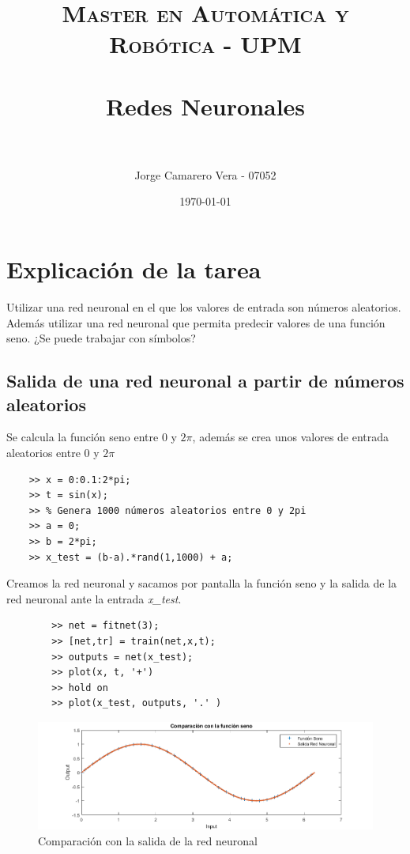 \documentclass[a4paper, fontsize=11pt]{scrartcl} %
\title{	
	\normalfont \normalsize 
	\textsc{Master en Automática y Robótica - UPM} \\ [25pt] %
	\horrule{0.5pt} \\[0.4cm] %
	\huge Redes Neuronales \\ %
	\horrule{2pt} \\[0.5cm] %
}
\author{Jorge Camarero Vera - 07052} %
\date{\normalsize\today} %
\numberwithin{equation}{section} %
\numberwithin{figure}{section} %
\numberwithin{table}{section} %
\begin{document}
	\maketitle
	
	\section{Explicación de la tarea}
	
	Utilizar una red neuronal en el que los valores de entrada son números aleatorios. Además utilizar una red neuronal que permita predecir valores de una función seno. ¿Se puede trabajar con símbolos?

	\subsection{Salida de una red neuronal a partir de números aleatorios}	
	
	Se calcula la función seno entre $0$ y $2\pi$, además se crea unos valores de entrada aleatorios entre $0$ y $2\pi$
	
	\begin{lstlisting}
	>> x = 0:0.1:2*pi;
	>> t = sin(x);
	>> % Genera 1000 números aleatorios entre 0 y 2pi
	>> a = 0;
	>> b = 2*pi;
	>> x_test = (b-a).*rand(1,1000) + a;
	\end{lstlisting}
	
	Creamos la red neuronal y sacamos por pantalla la función seno y la salida de la red neuronal ante la entrada \textit{x\_test}.
	
	\begin{lstlisting}
		>> net = fitnet(3);
		>> [net,tr] = train(net,x,t);
		>> outputs = net(x_test);
		>> plot(x, t, '+')
		>> hold on
		>> plot(x_test, outputs, '.' )
	\end{lstlisting}
	
	
	\begin{figure}[h!]
		\centering
		\includegraphics[width=1.0\linewidth]{images/Neuronal.PNG}
		\caption{Comparación con la salida de la red neuronal}
		\label{output neuronal}
	\end{figure}
	\FloatBarrier
	
\end{document}
